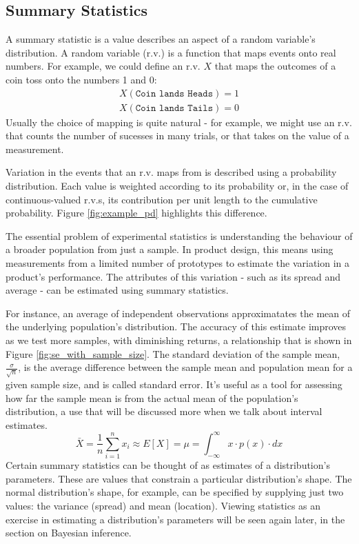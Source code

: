 \documentclass[11pt,a4paper,article]{memoir} %
\begin{document}
\subsection*{Summary Statistics}
 A summary statistic is a value describes an aspect of a random variable's distribution. A random variable (r.v.) is a function that maps events onto real numbers. For example, we could define an r.v. $X$ that maps the outcomes of a coin toss onto the numbers 1 and 0:
 \begin{align}
	X(\texttt{Coin lands Heads}) = 1 \\
	X(\texttt{Coin lands Tails}) =0
 \end{align}
Usually the choice of mapping is quite natural - for example, we might use an r.v. that counts the number of sucesses in many trials, or that takes on the value of a measurement.
\par
Variation in the events that an r.v. maps from is described using a probability distribution. Each value is weighted according to its probability or, in the case of continuous-valued r.v.s, its contribution per unit length to the cumulative probability. Figure \ref{fig:example_pd} highlights this difference.
\par
The essential problem of experimental statistics is understanding the behaviour of a broader population from just a sample. In product design, this means using measurements from a limited number of prototypes to estimate the variation in a product's performance. The attributes of this variation - such as its spread and average - can be estimated using summary statistics.
 \par
For instance, an average of independent observations approximatates the mean of the underlying population's distribution. The accuracy of this estimate improves as we test more samples, with diminishing returns, a relationship that is shown in Figure \ref{fig:se_with_sample_size}. The standard deviation of the sample mean, $\frac{\sigma}{\sqrt{n}}$, is the average difference between the sample mean and population mean for a given sample size, and is called standard error. It's useful as a tool for assessing how far the sample mean is from the actual mean of the population's distribution, a use that will be discussed more when we talk about interval estimates.
\begin{equation}
	\bar{X} = \frac{1}{n}\sum_{i = 1}^{n}x_i  \approx E[X]= \mu = \int_{-\infty}^{\infty}x\cdot p(x)\cdot dx
\end{equation}
Certain summary statistics can be thought of as estimates of a distribution's parameters. These are values that constrain a particular distribution's shape. The normal distribution's shape, for example, can be specified by supplying just two values: the variance (spread) and mean (location). Viewing statistics as an exercise in estimating a distribution's parameters will be seen again later, in the section on Bayesian inference.
\end{document}
